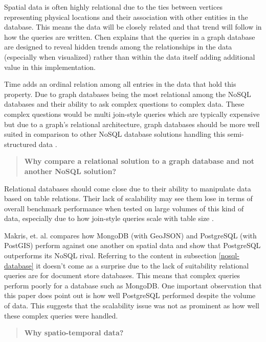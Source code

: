 Spatial data is often highly relational due to the ties between vertices representing physical locations and their association with other entities in the database. This means the data will be closely related and that trend will follow in how the queries are written. Chen \cite{socialdata} explains that the queries in a graph database are designed to reveal hidden trends among the relationships in the data (especially when visualized) rather than within the data itself adding additional value in this implementation.

Time adds an ordinal relation among all entries in the data that hold this property. Due to graph databases being the most relational among the NoSQL databases and their ability to ask complex questions to complex data. These complex questions would be multi join-style queries which are typically expensive but due to a graph's relational architecture, graph databases should be more well suited in comparison to other NoSQL database solutions handling this semi-structured data \cite{data-in-nosql}.

\begin{quote}
    \textbf{Why compare a relational solution to a graph database and not another NoSQL solution?}
\end{quote}

Relational databases should come close due to their ability to manipulate data based on table relations. Their lack of scalability may see them lose in terms of overall benchmark performance when tested on large volumes of this kind of data, especially due to how join-style queries scale with table size \cite{data-in-nosql}.

Makris, et. al. \cite{mongovspostgres} compares how MongoDB (with GeoJSON) and PostgreSQL (with PostGIS) perform against one another on spatial data and show that PostgreSQL outperforms its NoSQL rival. Referring to the content in subsection \ref{nosql-database} it doesn't come as a surprise due to the lack of suitability relational queries are for document store databases. This means that complex queries perform poorly for a database such as MongoDB. One important observation that this paper does point out is how well PostgreSQL performed despite the volume of data. This suggests that the scalability issue was not as prominent as how well these complex queries were handled.

\begin{quote}
    \textbf{Why spatio-temporal data?}
\end{quote}

